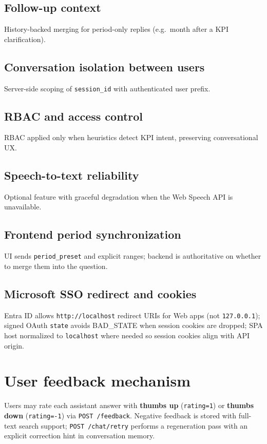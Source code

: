 \documentclass[12pt,a4paper,openany]{report}
\begin{document}
\subsection{Follow-up context}
History-backed merging for period-only replies (e.g.\ month after a KPI clarification).

\subsection{Conversation isolation between users}
Server-side scoping of \texttt{session\_id} with authenticated user prefix.

\subsection{RBAC and access control}
RBAC applied only when heuristics detect KPI intent, preserving conversational UX.

\subsection{Speech-to-text reliability}
Optional feature with graceful degradation when the Web Speech API is unavailable.

\subsection{Frontend period synchronization}
UI sends \texttt{period\_preset} and explicit ranges; backend is authoritative on whether to merge them into the question.

\subsection{Microsoft SSO redirect and cookies}
Entra ID allows \texttt{http://localhost} redirect URIs for Web apps (not \texttt{127.0.0.1}); signed OAuth \texttt{state} avoids BAD\_STATE when session cookies are dropped; SPA host normalized to \texttt{localhost} where needed so session cookies align with API origin.

\section{User feedback mechanism}
Users may rate each assistant answer with \textbf{thumbs up} (\texttt{rating=1}) or \textbf{thumbs down} (\texttt{rating=-1}) via \texttt{POST /feedback}. Negative feedback is stored with full-text search support; \texttt{POST /chat/retry} performs a regeneration pass with an explicit correction hint in conversation memory.
\end{document}
